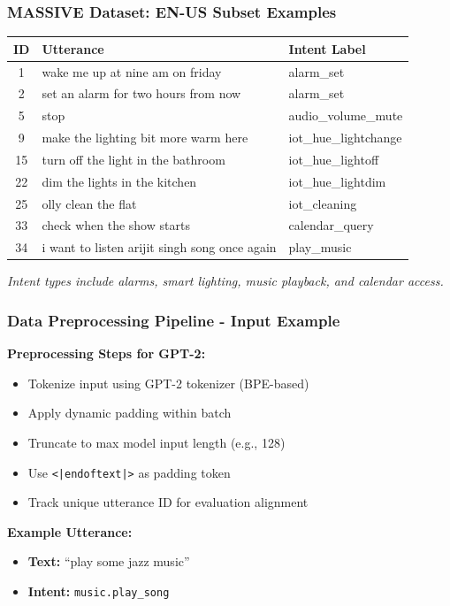 \documentclass{beamer}
\begin{document}
\begin{frame}
  \frametitle{MASSIVE Dataset: EN-US Subset Examples}
  
  \vspace{0.5em}
  \centering
  \scriptsize
  \begin{tabular}{cll}
  \toprule
  \textbf{ID} & \textbf{Utterance} & \textbf{Intent Label} \\
  \midrule
  1   & wake me up at nine am on friday     & alarm\_set \\
  2   & set an alarm for two hours from now & alarm\_set \\
  5   & stop                                & audio\_volume\_mute \\
  9   & make the lighting bit more warm here & iot\_hue\_lightchange \\
  15  & turn off the light in the bathroom  & iot\_hue\_lightoff \\
  22  & dim the lights in the kitchen       & iot\_hue\_lightdim \\
  25  & olly clean the flat                 & iot\_cleaning \\
  33  & check when the show starts          & calendar\_query \\
  34  & i want to listen arijit singh song once again & play\_music \\
  \bottomrule
  \end{tabular}
  \vspace{1em}
  
  \textit{Intent types include alarms, smart lighting, music playback, and calendar access.}
  \end{frame}

\begin{frame}
\frametitle{Data Preprocessing Pipeline - Input Example}
\textbf{Preprocessing Steps for GPT-2:}
\begin{itemize}
  \item Tokenize input using GPT-2 tokenizer (BPE-based)
  \item Apply dynamic padding within batch
  \item Truncate to max model input length (e.g., 128)
  \item Use \texttt{<|endoftext|>} as padding token
  \item Track unique utterance ID for evaluation alignment
\end{itemize}
\vspace{1em}
\textbf{Example Utterance:}
\begin{itemize}
    \item \textbf{Text:} ``play some jazz music''
    \item \textbf{Intent:} \texttt{music.play\_song}
\end{itemize}
\end{frame}
\end{document}
